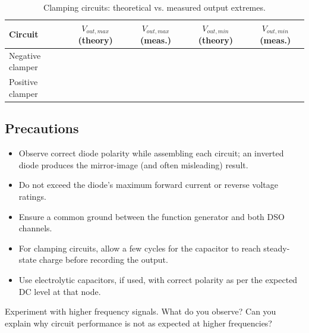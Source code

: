 \begin{table}[hb!]
	\centering
	\begin{tabular}{@{}lcccc@{}}
		\toprule
		Circuit & $V_{out,max}$ (theory) & $V_{out,max}$ (meas.) & $V_{out,min}$ (theory) & $V_{out,min}$ (meas.) \\
		\midrule
		Negative clamper &  &  &  &  \\
		Positive clamper &  &  &  &  \\
		\bottomrule
	\end{tabular}
	\caption{Clamping circuits: theoretical vs. measured output extremes.}
\end{table}

\subsection{Precautions}
\begin{itemize}
	\item Observe correct diode polarity while assembling each circuit; an inverted diode produces the mirror-image (and often misleading) result.
	\item Do not exceed the diode's maximum forward current or reverse voltage ratings.
	\item Ensure a common ground between the function generator and both DSO channels.
	\item For clamping circuits, allow a few cycles for the capacitor to reach steady-state charge before recording the output.
	\item Use electrolytic capacitors, if used, with correct polarity as per the expected DC level at that node.
\end{itemize}
\begin{notebox}
	Experiment with higher frequency signals. What do you observe? Can you explain why circuit performance is not as expected at higher frequencies?
\end{notebox}
